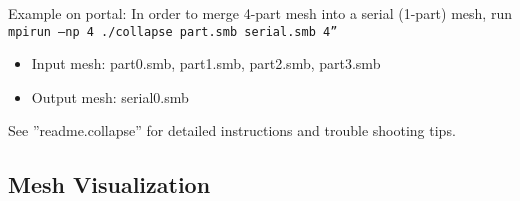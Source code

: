 Example on portal:
\newline
In order to merge 4-part mesh into a serial (1-part) mesh, run
\texttt{mpirun –np 4 ./collapse part.smb serial.smb 4”
}
\begin{itemize}
\item	Input mesh: part0.smb, part1.smb, part2.smb, part3.smb
\item	Output mesh: serial0.smb
\end{itemize}

See ”readme.collapse” for detailed instructions and trouble shooting tips.


\subsection{Mesh Visualization}
